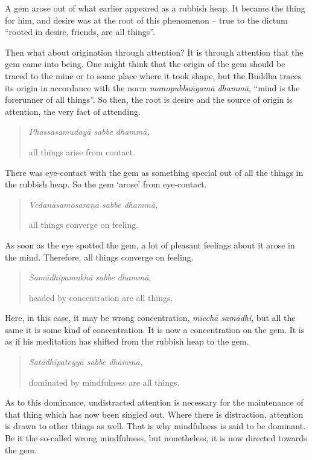 A gem arose out of what earlier appeared as a rubbish heap. It became the thing for him, and desire was at the root of this phenomenon -- true to the dictum ``rooted in desire, friends, are all things''.

Then what about origination through attention? It is through attention that the gem came into being. One might think that the origin of the gem should be traced to the mine or to some place where it took shape, but the Buddha traces its origin in accordance with the norm \emph{manopubbaṅgamā dhammā}, ``mind is the forerunner of all things''. So then, the root is desire and the source of origin is attention, the very fact of attending.

\begin{quote}
\emph{Phassasamudayā sabbe dhammā,}

all things arise from contact.
\end{quote}

There was eye-contact with the gem as something special out of all the things in the rubbish heap. So the gem `arose' from eye-contact.

\begin{quote}
\emph{Vedanāsamosaraṇā sabbe dhammā,}

all things converge on feeling.
\end{quote}

As soon as the eye spotted the gem, a lot of pleasant feelings about it arose in the mind. Therefore, all things converge on feeling.

\begin{quote}
\emph{Samādhipamukhā sabbe dhammā,}

headed by concentration are all things.
\end{quote}

Here, in this case, it may be wrong concentration, \emph{micchā samādhi}, but all the same it is some kind of concentration. It is now a concentration on the gem. It is as if his meditation has shifted from the rubbish heap to the gem.

\begin{quote}
\emph{Satādhipateyyā sabbe dhammā,}

dominated by mindfulness are all things.
\end{quote}

As to this dominance, undistracted attention is necessary for the maintenance of that thing which has now been singled out. Where there is distraction, attention is drawn to other things as well. That is why mindfulness is said to be dominant. Be it the so-called wrong mindfulness, but nonetheless, it is now directed towards the gem.

